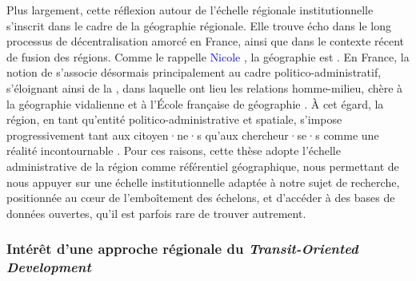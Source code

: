 \begin{refsegment}
Plus largement, cette réflexion autour de l’échelle régionale institutionnelle s’inscrit dans le cadre de la géographie régionale. Elle trouve écho dans le long processus de décentralisation amorcé en France, ainsi que dans le contexte récent de fusion des régions. Comme le rappelle \textcolor{blue}{Nicole} \textcolor{blue}{\textcite[107]{girard_region_2004}}, la géographie est . En France, la notion de  s’associe désormais principalement au cadre politico-administratif, s’éloignant ainsi de la , dans laquelle ont lieu les relations homme-milieu, chère à la géographie vidalienne et à l’École française de géographie \textcolor{blue}{\autocite[391]{mercier_entre_2001}}. À cet égard, la région, en tant qu’entité politico-administrative et spatiale, s’impose progressivement tant aux citoyen·ne·s qu’aux chercheur·se·s comme une réalité incontournable \textcolor{blue}{\autocite[111]{girard_region_2004}}. Pour ces raisons, cette thèse adopte l’échelle administrative de la région comme référentiel géographique, nous permettant de nous appuyer sur une échelle institutionnelle adaptée à notre sujet de recherche, positionnée au cœur de l’emboîtement des échelons, et d'accéder à des bases de données ouvertes, qu'il est parfois rare de trouver autrement.%

\subsubsection*{Intérêt d'une approche régionale du \textsl{Transit-Oriented Development}
    \label{chap3:approche-regionale}
    }


\end{refsegment}

